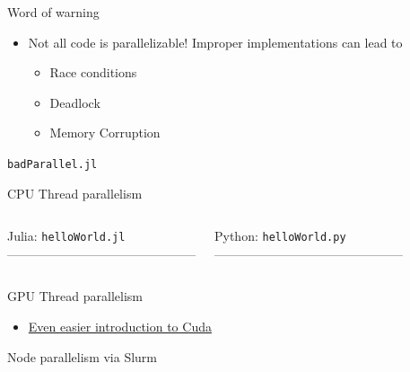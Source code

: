 \documentclass[dvipsnames,pdf,9pt]{beamer}
\newcommand{\<}{\langle}
\renewcommand{\>}{\rangle}
\begin{document}
\begin{frame}[fragile]{Word of warning}
  \begin{itemize}
  \item Not all code is parallelizable! Improper implementations can lead to
    \begin{itemize}
    \item Race conditions
    \item Deadlock
    \item Memory Corruption
    \end{itemize}
  \end{itemize}
  \verb+badParallel.jl+
  

\end{frame}

\begin{frame}[t, fragile]{CPU Thread parallelism}
  \begin{columns}
    Julia: \verb+helloWorld.jl+ \\
    ---------------------------------------------
    \small{
    }

    Python: \verb+helloWorld.py+ \\
    ---------------------------------------------
    \small{
      }

  \end{columns}
\end{frame}

\begin{frame}{GPU Thread parallelism}
  \begin{itemize}
  \item \href{https://developer.nvidia.com/blog/even-easier-introduction-cuda/}{Even easier introduction to Cuda}
  \end{itemize}
\end{frame}

\begin{frame}{Node parallelism via Slurm}

\end{frame}
\end{document}
